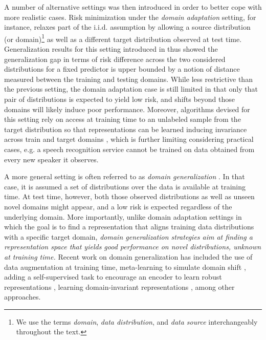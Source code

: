 \documentclass{article}
\begin{document}
A number of alternative settings was then introduced in order to better cope with more realistic cases. Risk minimization under the \emph{domain adaptation} setting, for instance, relaxes part of the i.i.d. assumption by allowing a source distribution (or domain)\footnote{We use the terms \textit{domain}, \textit{data distribution}, and \textit{data source} interchangeably throughout the text.} as well as a different target distribution observed at test time. Generalization results for this setting introduced in \cite{ben2007analysis} thus showed the generalization gap in terms of risk difference across the two considered distributions for a fixed predictor is upper bounded by a notion of distance measured between the training and testing domains. While less restrictive than the previous setting, the domain adaptation case is still limited in that only that pair of distributions is expected to yield low risk, and shifts beyond those domains will likely induce poor performance. Moreover, algorithms devised for this setting rely on access at training time to an unlabeled sample from the target distribution so that representations can be learned inducing invariance across train and target domains \cite{ganin2016domain}, which is further limiting considering practical cases, e.g. a speech recognition service cannot be trained on data obtained from every new speaker it observes.

A more general setting is often referred to as \textit{domain generalization} \cite{muandet2013domain}. In that case, it is assumed a set of distributions over the data is available at training time. At test time, however, both those observed distributions as well as unseen novel domains might appear, and a low risk is expected regardless of the underlying domain. More importantly, unlike domain adaptation settings in which the goal is to find a representation that aligns training data distributions with a specific target domain, \emph{domain generalization strategies aim at finding a representation space that yields good performance on novel distributions, unknown at training time.} Recent work on domain generalization has included the use of data augmentation \cite{shankar2018generalizing, volpi2018generalizing} at training time, meta-learning to simulate domain shift \cite{li2018learning}, adding a self-supervised task to encourage an encoder to learn robust representations \cite{carlucci2019domain}, learning domain-invariant representations \cite{li2018deep}, among other approaches.
\end{document}
